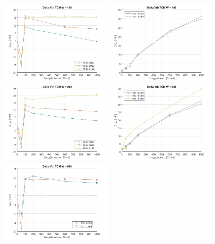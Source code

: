 \documentclass[
	a4paper,
	cleardoublepage=empty,
	headings=twolinechapter,
	numbers=autoenddot,
]{scrbook}
\begin{document}
\begin{figure}[H]
  \centering
  \includegraphics[width=0.49\textwidth]{sovrapposizione-deltaVth-TCM-N100}
  \includegraphics[width=0.49\textwidth]{sovrapposizione-deltaVth-TCM-P100}
  \includegraphics[width=0.49\textwidth]{sovrapposizione-deltaVth-TCM-N200}
  \includegraphics[width=0.49\textwidth]{sovrapposizione-deltaVth-TCM-P200}
  \includegraphics[width=0.49\textwidth]{sovrapposizione-deltaVth-TCM-N600}

\end{figure}
\end{document}
